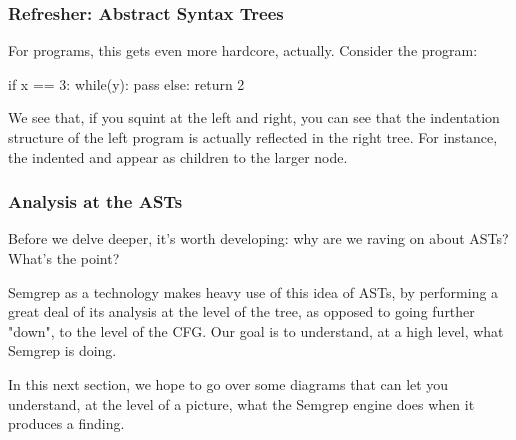 \documentclass[aspectratio=169, handout]{beamer}
\begin{document}
\begin{frame}[fragile]
  \frametitle{Refresher: Abstract Syntax Trees}

  \begin{minipage}{0.35\textwidth}
    \raggedright
    For programs, this gets even more hardcore, actually. Consider the program:
    \begin{pythoncodeblock}
      if x == 3:
        while(y):
          pass
      else:
        return 2
    \end{pythoncodeblock}
  \end{minipage}
  \pause
  \hspace{\fill}
  \begin{minipage}{0.6\textwidth}
    \begin{center}
    \end{center}
  \end{minipage}

  \pause
  \vspace{\fill}

  We see that, if you squint at the left and right, you can see that the indentation
  structure of the left program is actually reflected in the right tree.
  For instance, the indented  and  appear as children to the
  larger  node.
\end{frame}


 \begin{frame}[fragile]
   \frametitle{Analysis at the ASTs}

   Before we delve deeper, it's worth developing: why are we raving on about ASTs?
   What's the point?

   \pause
   \vspace{\fill}

   Semgrep as a technology makes heavy use of this idea of ASTs, by performing a
   great deal of its analysis at the level of the tree, as opposed to going
   further "down", to the level of the CFG. Our goal is to understand, at a high
   level, what Semgrep is doing.

  \pause
  \vspace{\fill}

  In this next section, we hope to go over some diagrams that can let you understand,
  at the level of a picture, what the Semgrep engine does when it produces a finding.
\end{frame}
\end{document}
